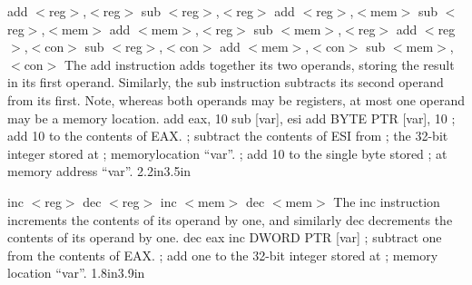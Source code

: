 {add $<$reg$>$,$<$reg$>$ \hspace{0.5in} sub $<$reg$>$,$<$reg$>$ \newline
add $<$reg$>$,$<$mem$>$ \hspace{0.5in} sub $<$reg$>$,$<$mem$>$ \newline
add $<$mem$>$,$<$reg$>$ \hspace{0.5in} sub $<$mem$>$,$<$reg$>$ \newline
add $<$reg$>$,$<$con$>$ \hspace{0.5in} sub $<$reg$>$,$<$con$>$ \newline
add $<$mem$>$,$<$con$>$ \hspace{0.5in} sub $<$mem$>$,$<$con$>$}
{The add instruction adds together its two operands, storing the
  result in its first operand. Similarly, the sub instruction
  subtracts its second operand from its first.  Note, whereas both
  operands may be registers, at most one operand may be a memory
  location.}
{add eax, 10\newline 
sub [var], esi\newline\newline\newline
add BYTE PTR [var], 10}
{; add 10 to the contents of EAX. \newline
; subtract the contents of ESI from \newline
; the 32-bit integer stored at \newline
; memorylocation ``var''.\newline
; add 10 to the single byte stored\newline
; at memory address ``var''.\newline}
{2.2in}{3.5in}

{inc $<$reg$>$ \hspace{0.5in} dec $<$reg$>$\newline
inc $<$mem$>$ \hspace{0.5in} dec $<$mem$>$}
{The inc instruction increments the contents of its operand by one,
  and similarly dec decrements the contents of its operand by one.}
{dec eax \newline inc DWORD PTR [var]}
{; subtract one from the contents of EAX. \newline
; add one to the 32-bit integer stored at \newline
; memory location ``var''.}
{1.8in}{3.9in}

